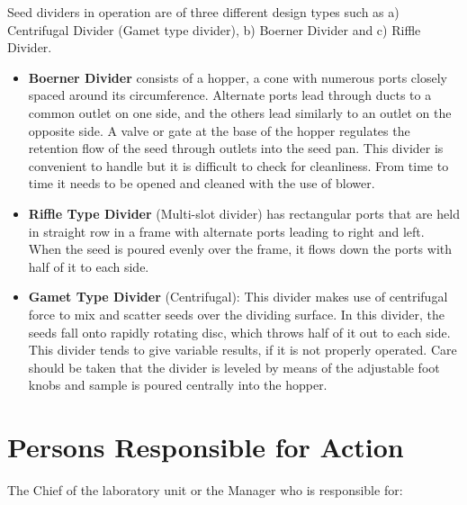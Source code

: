 \documentclass[]{book}
\providecommand{\tightlist}{%
  \setlength{\itemsep}{0pt}\setlength{\parskip}{0pt}}
\begin{document}
Seed dividers in operation are of three different design types such as
a) Centrifugal Divider (Gamet type divider), b) Boerner Divider and c)
Riffle Divider.

\begin{itemize}
\tightlist
\item
  \textbf{Boerner Divider} consists of a hopper, a cone with numerous
  ports closely spaced around its circumference. Alternate ports lead
  through ducts to a common outlet on one side, and the others lead
  similarly to an outlet on the opposite side. A valve or gate at the
  base of the hopper regulates the retention flow of the seed through
  outlets into the seed pan. This divider is convenient to handle but it
  is difficult to check for cleanliness. From time to time it needs to
  be opened and cleaned with the use of blower.
\item
  \textbf{Riffle Type Divider} (Multi-slot divider) has rectangular
  ports that are held in straight row in a frame with alternate ports
  leading to right and left. When the seed is poured evenly over the
  frame, it flows down the ports with half of it to each side.
\item
  \textbf{Gamet Type Divider} (Centrifugal): This divider makes use of
  centrifugal force to mix and scatter seeds over the dividing surface.
  In this divider, the seeds fall onto rapidly rotating disc, which
  throws half of it out to each side. This divider tends to give
  variable results, if it is not properly operated. Care should be taken
  that the divider is leveled by means of the adjustable foot knobs and
  sample is poured centrally into the hopper.
\end{itemize}

\section{Persons Responsible for
Action}\label{persons-responsible-for-action}

The Chief of the laboratory unit or the Manager who is responsible for:
\end{document}
